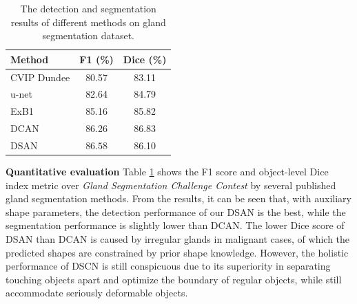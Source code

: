 \begin{table}
\begin{center}
\begin{tabular}{lcc}
\hline
		Method & F1 (\%) & Dice (\%) \\
		\hline
        CVIP Dundee &80.57& 83.11 \\
		u-net & 82.64 & 84.79 \\
		ExB1 & 85.16 & 85.82 \\
		DCAN & 86.26 & $\mathbf{86.83}$ \\
		DSAN & $\mathbf{86.58}$ & 86.10 \\
		\hline
\end{tabular}
\end{center}
\caption{The detection and segmentation results of different methods on gland segmentation dataset.}
\label{tab:gland}
\end{table}

\textbf{Quantitative evaluation}
Table \ref{tab:gland} shows the F1 score and object-level Dice index metric over \emph{Gland Segmentation Challenge Contest} by several published gland segmentation methods.
From the results, it can be seen that, with auxiliary shape parameters, the detection performance of our DSAN is the best, while the segmentation performance is slightly lower than DCAN.
The lower Dice score of DSAN than DCAN is caused by irregular glands in malignant cases, of which the predicted shapes are constrained by prior shape knowledge.
However, the holistic performance of DSCN is still conspicuous due to its superiority in separating touching objects apart and optimize the boundary of regular objects, while still accommodate seriously deformable objects.